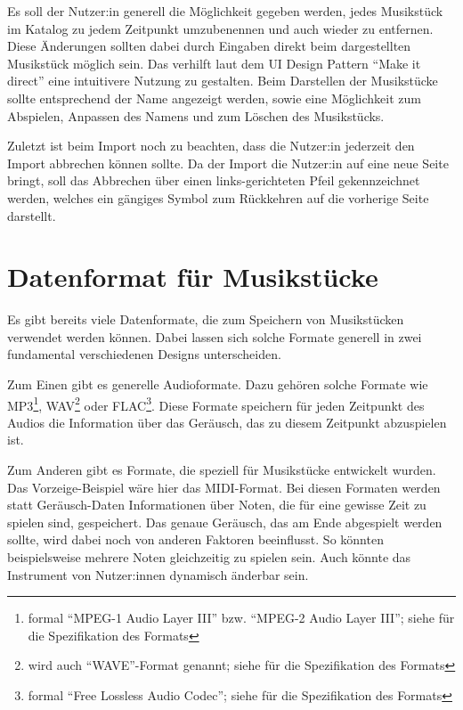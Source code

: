 Es soll der Nutzer:in generell die Möglichkeit gegeben werden, jedes Musikstück im Katalog zu jedem Zeitpunkt umzubenennen und auch wieder zu entfernen.
Diese Änderungen sollten dabei durch Eingaben direkt beim dargestellten Musikstück möglich sein.
Das verhilft laut dem \ac{UI} Design Pattern \enquote{Make it direct} eine intuitivere Nutzung zu gestalten.
Beim Darstellen der Musikstücke sollte entsprechend der Name angezeigt werden, sowie eine Möglichkeit zum Abspielen, Anpassen des Namens und zum Löschen des Musikstücks.

Zuletzt ist beim Import noch zu beachten, dass die Nutzer:in jederzeit den Import abbrechen können sollte.
Da der Import die Nutzer:in auf eine neue Seite bringt, soll das Abbrechen über einen links-gerichteten Pfeil gekennzeichnet werden, welches ein gängiges Symbol zum Rückkehren auf die vorherige Seite darstellt.



\section{Datenformat für Musikstücke} \label{vorgehenSW-PIDI}

Es gibt bereits viele Datenformate, die zum Speichern von Musikstücken verwendet werden können. Dabei lassen sich solche Formate generell in zwei fundamental verschiedenen Designs unterscheiden.

Zum Einen gibt es generelle Audioformate. Dazu gehören solche Formate wie MP3\footnote{formal \enquote{MPEG-1 Audio Layer III} bzw. \enquote{MPEG-2 Audio Layer III}; siehe \cite{iso.MP3} für die Spezifikation des Formats}, WAV\footnote{wird auch \enquote{WAVE}-Format genannt; siehe \cite{kab.WaveFileSpecifications.22} für die Spezifikation des Formats} oder FLAC\footnote{formal \enquote{Free Lossless Audio Codec}; siehe \cite{bw.FLAC.24} für die Spezifikation des Formats}.
Diese Formate speichern für jeden Zeitpunkt des Audios die Information über das Geräusch, das zu diesem Zeitpunkt abzuspielen ist.

Zum Anderen gibt es Formate, die speziell für Musikstücke entwickelt wurden.
Das Vorzeige-Beispiel wäre hier das \ac{MIDI}-Format.
Bei diesen Formaten werden statt Geräusch-Daten Informationen über Noten, die für eine gewisse Zeit zu spielen sind, gespeichert.
Das genaue Geräusch, das am Ende abgespielt werden sollte, wird dabei noch von anderen Faktoren beeinflusst.
So könnten beispielsweise mehrere Noten gleichzeitig zu spielen sein.
Auch könnte das Instrument von Nutzer:innen dynamisch änderbar sein.

